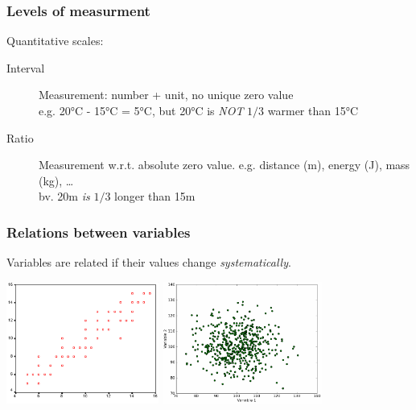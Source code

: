 \documentclass{beamer}
\begin{document}
\begin{frame}
  \frametitle{Levels of measurment}

  Quantitative scales:

  \begin{description}
    \item[Interval] Measurement: number + unit, no unique zero value\\
      e.g. 20°C - 15°C = 5°C, but 20°C is \emph{NOT} $1/3$ warmer than 15°C
    \item[Ratio] Measurement w.r.t. absolute zero value. e.g. distance (m), energy (J), mass (kg), \ldots\\
      bv. 20m \emph{is} $1/3$ longer than 15m
  \end{description}
\end{frame}

\begin{frame}
  \frametitle{Relations between variables}

  Variables are related if their values change \emph{systematically}.

  \begin{center}
    \includegraphics[height=4cm]{img/les1-08a}
    \includegraphics[height=4cm]{img/les1-08b}
  \end{center}
\end{frame}
\end{document}
